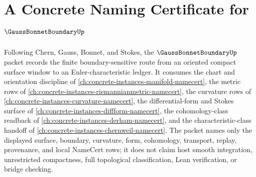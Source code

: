 \chapter{A Concrete Naming Certificate for $\GaussBonnetBoundaryUp$}
\label{ch:concrete-instances-gauss-bonnet-boundary-namecert}

Following Chern, Gauss, Bonnet, and Stokes, the $\GaussBonnetBoundaryUp$ packet records the finite boundary-sensitive route from an oriented compact surface window to an Euler-characteristic ledger. It consumes the chart and orientation discipline of \autoref{ch:concrete-instances-manifold-namecert}, the metric rows of \autoref{ch:concrete-instances-riemannianmetric-namecert}, the curvature rows of \autoref{ch:concrete-instances-curvature-namecert}, the differential-form and Stokes surface of \autoref{ch:concrete-instances-diffform-namecert}, the cohomology-class readback of \autoref{ch:concrete-instances-derham-namecert}, and the characteristic-class handoff of \autoref{ch:concrete-instances-chernweil-namecert}. The packet names only the displayed surface, boundary, curvature, form, cohomology, transport, replay, provenance, and local NameCert rows; it does not claim host smooth integration, unrestricted compactness, full topological classification, Lean verification, or bridge checking.

